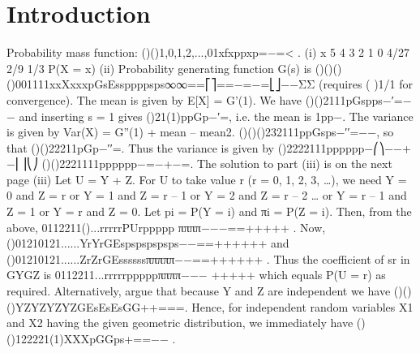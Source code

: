 \documentclass{article}
\author{kobriendublin }
\date{December 2018}
\begin{document}
\section{Introduction}
\begin{enumerate}[(i)]
Probability mass function: ()()1,0,1,2,...,01xfxppxp=−=< .
(i)
x
5
4
3
2
1
0
4/27
2/9
1/3
P(X = x)
(ii) Probability generating function G(s) is
()()(){}()001111xxXxxxpGsEssppppsps∞∞==⎡⎤==−=−=⎣⎦−−ΣΣ
(requires (
)1/1 for convergence).
The mean is given by E[X] = G'(1). We have ()(){}2111pGspps−′=−− and inserting s = 1 gives ()21(1)ppGp−′=, i.e. the mean is 1pp−.
The variance is given by Var(X) = G''(1) + mean – mean2. ()()(){}232111ppGsps−′′=−−, so that ()()22211pGp−′′=. Thus the variance is given by ()2222111pppppp−⎛⎞−−+−⎜⎟⎝⎠ ()(){}2221111pppppp−=−+−=.
The solution to part (iii) is on the next page
(iii) Let U = Y + Z. For U to take value r (r = 0, 1, 2, 3, …), we need
Y = 0 and Z = r
or Y = 1 and Z = r – 1
or Y = 2 and Z = r – 2
…
or Y = r – 1 and Z = 1
or Y = r and Z = 0.
Let pi = P(Y = i) and πi = P(Z = i). Then, from the above,
0112211()...rrrrrPUrppppp ππππ−−−==+++++ .
Now,
()01210121......YrYrGEspspspspsps−−==++++++
  and
()01210121......ZrZrGEssssssπππππ−−==++++++ .
Thus the coefficient of sr in GYGZ is 0112211...rrrrrpppppππππ−−− +++++ which equals P(U = r) as required.
Alternatively, argue that because Y and Z are independent we have
()()()YZYZYZYZGEsEsEsGG++===.
Hence, for independent random variables X1 and X2 having the given geometric distribution, we immediately have
()()122221(1)XXXpGGps+==−− .
\end{enumerate}
\end{document}
